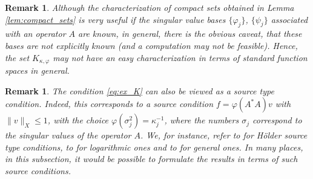 \documentclass[12pt,twoside]{amsart}
\numberwithin{equation}{section}
\renewcommand{\leq}{\leqslant}
\newtheorem{remark}[theorem]{Remark}
\begin{document}
\begin{appendix}
\begin{remark}
\label{rmk:compact_caveat}
Although the characterization of compact sets obtained in Lemma \ref{lem:compact_sets} is very useful if the singular value bases $\{\varphi_j\}$, $\{\psi_j\}$ associated with an operator $A$ are known, in general, there is the obvious caveat, that these bases are not explicitly known (and a computation may not be feasible). Hence, the set $K_{\kappa,\varphi}$ may not have an easy characterization in terms of standard function spaces in general. 
\end{remark}

\begin{remark}
The condition \eqref{eq:ex_K} can also be viewed as a source type condition. Indeed, this corresponds to a source condition $f = \varphi(A^* A) v$ with $\| v \|_{X} \leq 1$, with the choice $\varphi(\sigma_j^2) = \kappa_j^{-1}$, where the numbers $\sigma_j$ correspond to the singular values of the operator $A$. We, for instance, refer to \cite{EHN} for Hölder source type conditions, to \cite{H00} for logarithmic ones and to \cite{MP03} for general ones. In many places, in this subsection, it would be possible to formulate the results in terms of such source conditions.
\end{remark}


\end{appendix}
\end{document}
